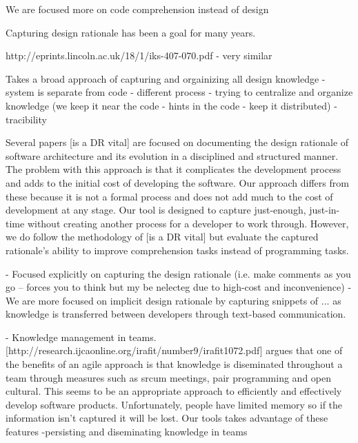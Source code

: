 \documentclass[../manifest.tex]{subfiles}
\begin{document}
We are focused more on code comprehension instead of design


Capturing design rationale has been a goal for many years.

http://eprints.lincoln.ac.uk/18/1/iks-407-070.pdf - very similar

Takes a broad approach of capturing and orgainizing all design knowledge
 - system is separate from code
 - different process
 - trying to centralize and organize knowledge (we keep it near the code - hints in the code - keep it distributed)
 - tracibility


Several papers [is a DR vital] are focused on documenting the design rationale of software architecture and its evolution in a disciplined and structured manner. The problem with this approach is that it complicates the development process and adds to the initial cost of developing the software. Our approach differs from these because it is not a formal process and does not add much to the cost of development at any stage. Our tool is designed to capture just-enough, just-in-time without creating another process for a developer to work through. However, we do follow the methodology of [is a DR vital] but evaluate the captured rationale's ability to improve comprehension tasks instead of programming tasks.

- Focused explicitly on capturing the design rationale (i.e. make comments as you go -- forces you to think but my be nelecteg due to high-cost and inconvenience)
- We are more focused on implicit design rationale by capturing snippets of ... as knowledge is transferred between developers through text-based communication.


- Knowledge management in teams. [http://research.ijcaonline.org/irafit/number9/irafit1072.pdf] argues that one of the benefits of an agile approach is that knowledge is diseminated throughout a team through measures such as srcum meetings, pair programming and open cultural. This seems to be an appropriate approach to efficiently and effectively develop software products. Unfortunately, people have limited memory so if the information isn't captured it will be lost. Our tools takes advantage of these features
 -persisting and diseminating knowledge in teams
\end{document}
